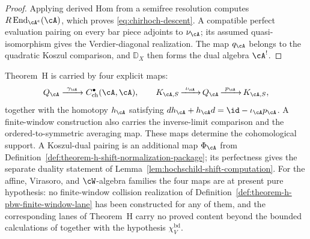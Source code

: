 \begin{proof}
Applying derived Hom from a semifree resolution computes
\(R\operatorname{End}_{\cA^e}(\cA)\), which proves
\eqref{eq:chirhoch-descent}.  A compatible perfect evaluation pairing
on every bar piece adjoints to \(\nu_\cA\); its assumed
quasi-isomorphism gives the Verdier-diagonal realization.  The map
\(q_\cA\) belongs to the quadratic Koszul comparison, and
\(\mathbb D_X\) then forms the dual algebra \(\cA^!\).
\end{proof}

\begin{remark}
\label{rem:theorem-H-filter-exactness}
Theorem~H is carried by four explicit maps:
\[
 Q_\cA\xrightarrow{\ \gamma_\cA\ }
 C^\bullet_{\mathrm{ch}}(\cA,\cA),
 \qquad
 K_{\cA,S}\mathop{\xrightarrow{\ \iota_\cA\ }}Q_\cA
 \mathop{\xrightarrow{\ p_\cA\ }}K_{\cA,S},
\]
together with the homotopy \(h_\cA\) satisfying
\(dh_\cA+h_\cA d=\id-\iota_\cA p_\cA\).  A finite-window
construction also carries the inverse-limit comparison and the
ordered-to-symmetric averaging map.  These maps determine the
cohomological support.  A Koszul-dual pairing is an additional map
\(\Phi_\cA\) from
Definition~\ref{def:theorem-h-shift-normalization-package}; its
perfectness gives the separate duality statement of
Lemma~\ref{lem:hochschild-shift-computation}.  For the affine,
Virasoro, and \(\cW\)-algebra families the four maps are at present
pure hypothesis: no finite-window collision realization of
Definition~\ref{def:theorem-h-pbw-finite-window-lane} has been
constructed for any of them, and the corresponding lanes of Theorem~H
carry no proved content beyond the bounded calculations of
\cite{BDSK21} together with the hypothesis \(\chi_V^{\mathrm{bd}}\).
\end{remark}

